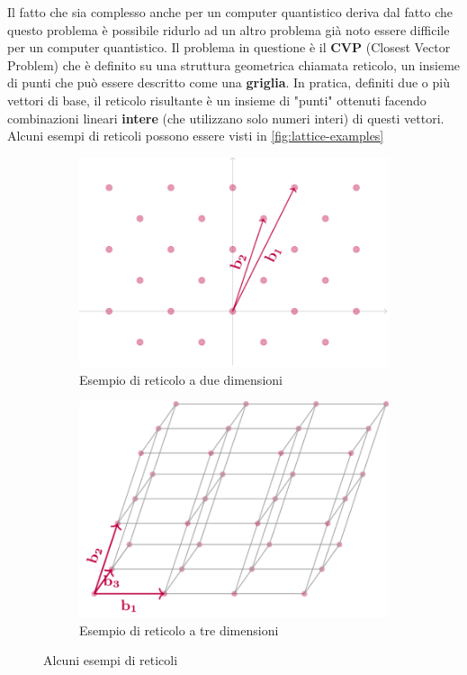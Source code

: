 Il fatto che sia complesso anche per un computer quantistico deriva dal fatto che questo problema è possibile ridurlo ad un altro problema già noto essere difficile per un computer quantistico. Il problema in questione è il \textbf{CVP} (Closest Vector Problem) che è definito su una struttura geometrica chiamata reticolo, un insieme di punti che può essere descritto come una \textbf{griglia}. In pratica, definiti due o più vettori di base, il reticolo risultante è un insieme di "punti" ottenuti facendo combinazioni lineari \textbf{intere} (che utilizzano solo numeri interi) di questi vettori. Alcuni esempi di reticoli possono essere visti in \autoref{fig:lattice-examples}

\begin{figure}[h]
    \begin{subfigure}{0.48\textwidth}
        \includegraphics[width=1\textwidth]{capitoli/figure-crittografia/lattice-2.png}
        \caption{Esempio di reticolo a due dimensioni}
    \end{subfigure}
    \hfill
    \begin{subfigure}{0.48\textwidth}
        \includegraphics[width=1\textwidth]{capitoli/figure-crittografia/lattice-3.png}
        \caption{Esempio di reticolo a tre dimensioni}
    \end{subfigure}
    \caption{Alcuni esempi di reticoli}
    \label{fig:lattice-examples}
\end{figure}

